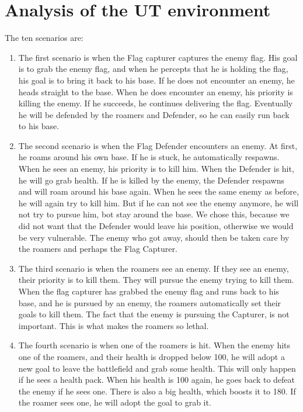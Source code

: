 \chapter{Analysis of the UT environment}

The ten scenarios are:
\begin{enumerate}
	\item The first scenario is when the Flag capturer captures the enemy flag. His goal is to grab the enemy flag, and when he percepts that he is holding the flag, his goal is to bring it back to his base. If he does not encounter an enemy, he heads straight to the base. When he does encounter an enemy, his priority is killing the enemy. If he succeeds, he continues delivering the flag. Eventually he will be defended by the roamers and Defender, so he can easily run back to his base.\\
	\item The second scenario is when the Flag Defender encounters an enemy. At first, he roams around his own base. If he is stuck, he automatically respawns. When he sees an enemy, his priority is to kill him. When the Defender is hit, he will go grab health. If he is killed by the enemy, the Defender respawns and will roam around his base again. When he sees the same enemy as before, he will again try to kill him. But if he can not see the enemy anymore, he will not try to pursue him, bot stay around the base. We chose this, because we did not want that the Defender would leave his position, otherwise we would be very vulnerable. The enemy who got away, should then be taken care by the roamers and perhaps the Flag Capturer.\\
	\item The third scenario is when the roamers see an enemy. If they see an enemy, their priority is to kill them. They will pursue the enemy trying to kill them. When the flag capturer has grabbed the enemy flag and runs back to his base, and he is pursued by an enemy, the roamers automatically set their goals to kill them. The fact that the enemy is pursuing the Capturer, is not important. This is what makes the roamers so lethal. \\
	\item The fourth scenario is when one of the roamers is hit. When the enemy hits one of the roamers, and their health is dropped below 100, he will adopt a new goal to leave the battlefield and grab some health. This will only happen if he sees a health pack. When his health is 100 again, he goes back to defeat the enemy if he sees one. There is also a big health, which boosts it to 180. If the roamer sees one, he will adopt the goal to grab it.\\

\end{enumerate}
